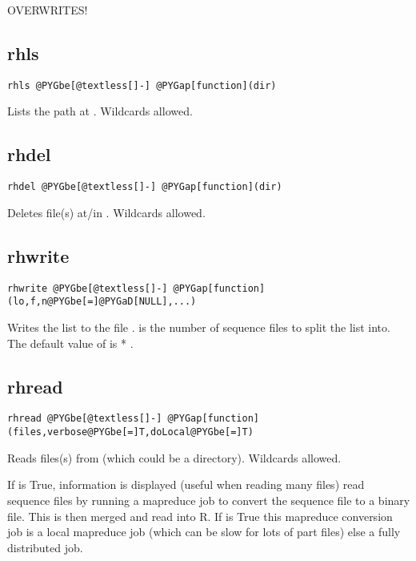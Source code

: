 \documentclass[letterpaper,10pt,english]{manual}
\begin{document}
OVERWRITES!


\subsection{rhls}

\begin{Verbatim}[commandchars=@\[\]]
rhls @PYGbe[@textless[]-] @PYGap[function](dir)
\end{Verbatim}

Lists the path at . Wildcards allowed.


\subsection{rhdel}

\begin{Verbatim}[commandchars=@\[\]]
rhdel @PYGbe[@textless[]-] @PYGap[function](dir)
\end{Verbatim}

Deletes file(s) at/in . Wildcards allowed.


\subsection{rhwrite}

\begin{Verbatim}[commandchars=@\[\]]
rhwrite @PYGbe[@textless[]-] @PYGap[function](lo,f,n@PYGbe[=]@PYGaD[NULL],...)
\end{Verbatim}

Writes the list   to the file .  is the number of sequence files
to split the list into.  The default value of  is
 *  .


\subsection{rhread}

\begin{Verbatim}[commandchars=@\[\]]
rhread @PYGbe[@textless[]-] @PYGap[function](files,verbose@PYGbe[=]T,doLocal@PYGbe[=]T)
\end{Verbatim}

Reads files(s) from  (which could be a directory). Wildcards allowed.

If  is True, information is displayed (useful when reading many
files)
 read sequence files by running a mapreduce   job to convert the
sequence file to a binary file.
This is then merged and read into R. If  is True this mapreduce
conversion job is a local mapreduce job (which can be slow for lots of part
files) else a fully distributed job.
\end{document}
